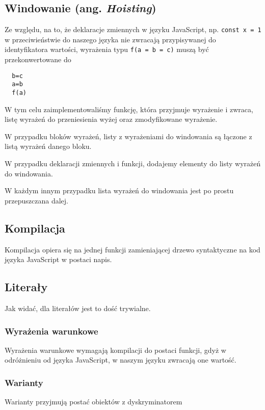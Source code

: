 \documentclass{article}
\begin{document}
\subsection{Windowanie (ang. \emph{Hoisting})}
Ze względu, na to, że deklaracje zmiennych w języku JavaScript, np. \lstinline{const x = 1} w przeciwieństwie do naszego języka nie zwracają przypisywanej do identyfikatora wartości, wyrażenia typu \lstinline{f(a = b = c)} muszą być przekonwertowane do
\begin{lstlisting}
  b=c
  a=b
  f(a)
\end{lstlisting}
W tym celu zaimplementowaliśmy funkcję, która przyjmuje wyrażenie i zwraca, listę wyrażeń do przeniesienia wyżej oraz zmodyfikowane wyrażenie.

W przypadku bloków wyrażeń, listy z wyrażeniami do windowania są łączone z listą wyrażeń danego bloku.



W przypadku deklaracji zmiennych i funkcji, dodajemy elementy do listy wyrażeń do windowania.\newpage

W każdym innym przypadku lista wyrażeń do windowania jest po prostu przepuszczana dalej.



\subsection{Kompilacja}
Kompilacja opiera się na jednej funkcji zamieniającej drzewo syntaktyczne na kod języka JavaScript w postaci napis.

\subsection{Literały}
Jak widać, dla literałów jest to dość trywialne.


\subsubsection{Wyrażenia warunkowe}
Wyrażenia warunkowe wymagają kompilacji do postaci funkcji, gdyż w odróżnieniu od języka JavaScript, w naszym języku zwracają one wartość.


\subsubsection{Warianty}
Warianty przyjmują postać obiektów z dyskryminatorem

\end{document}
